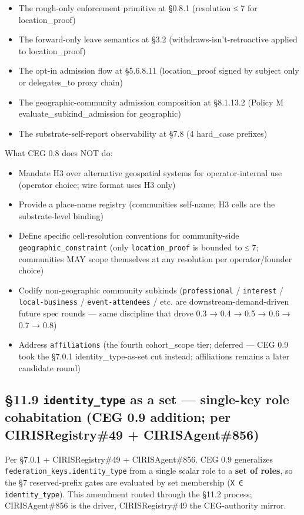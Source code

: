\documentclass[10pt]{article}
\begin{document}
\begin{itemize}\setlength\itemsep{0pt}
\item The rough-only enforcement primitive at §0.8.1 (resolution ≤ 7 for location\_proof)
\item The forward-only leave semantics at §3.2 (withdraws-isn't-retroactive applied to location\_proof)
\item The opt-in admission flow at §5.6.8.11 (location\_proof signed by subject only or delegates\_to proxy chain)
\item The geographic-community admission composition at §8.1.13.2 (Policy M evaluate\_subkind\_admission for geographic)
\item The substrate-self-report observability at §7.8 (4 hard\_case prefixes)
\end{itemize}


What CEG 0.8 does NOT do:

\begin{itemize}\setlength\itemsep{0pt}
\item Mandate H3 over alternative geospatial systems for operator-internal use (operator choice; wire format uses H3 only)
\item Provide a place-name registry (communities self-name; H3 cells are the substrate-level binding)
\item Define specific cell-resolution conventions for community-side \texttt{geographic\_constraint} (only \texttt{location\_proof} is bounded to ≤ 7; communities MAY scope themselves at any resolution per operator/founder choice)
\item Codify non-geographic community subkinds (\texttt{professional} / \texttt{interest} / \texttt{local-business} / \texttt{event-attendees} / etc. are downstream-demand-driven future spec rounds — same discipline that drove 0.3 → 0.4 → 0.5 → 0.6 → 0.7 → 0.8)
\item Address \texttt{affiliations} (the fourth cohort\_scope tier; deferred — CEG 0.9 took the §7.0.1 identity\_type-as-set cut instead; affiliations remains a later candidate round)
\end{itemize}


\subsection*{§11.9 \texttt{identity\_type} as a set — single-key role cohabitation (CEG 0.9 addition; per CIRISRegistry\#49 + CIRISAgent\#856)}


Per §7.0.1 + CIRISRegistry\#49 + CIRISAgent\#856. CEG 0.9 generalizes \texttt{federation\_keys.identity\_type} from a single scalar role to a \textbf{set of roles}, so the §7 reserved-prefix gates are evaluated by set membership (\texttt{X ∈ identity\_type}). This amendment routed through the §11.2 process; CIRISAgent\#856 is the driver, CIRISRegistry\#49 the CEG-authority mirror.
\end{document}

